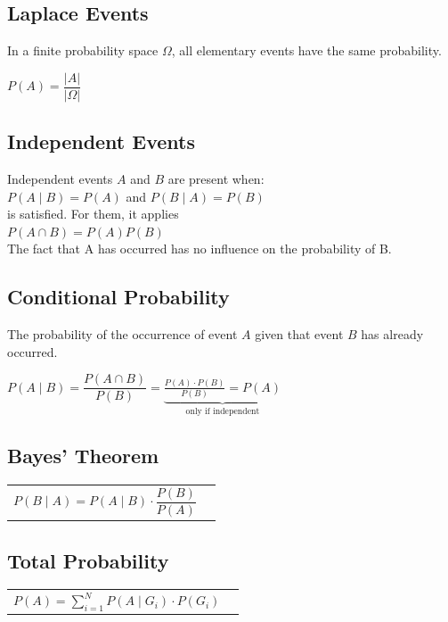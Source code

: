	\subsection{Laplace Events}
		In a finite probability space $\Omega$, all
		elementary events have the same probability.
		\begin{center}
		$P(A)=\dfrac{\left| A\right|}{\left|\Omega\right|}$
		\end{center}

	\subsection{Independent Events}
		Independent events $A$ and $B$ are present when:\\
		\hspace*{8mm} $P(A\mid B)=P(A)$ \hspace{4mm} and \hspace{4mm}
		$P(B\mid A)=P(B)$\\
		is satisfied. For them, it applies\\
		\hspace*{8mm} $P(A\cap B)=P(A)P(B)$\\
		The fact that A has occurred has no influence on the 
		probability of B.\vspace{1mm}


	\subsection{Conditional Probability}
		The probability of the occurrence of event $A$ given that
		event $B$ has already occurred.
		\begin{center}
		$P(A\mid B)= \dfrac{P(A\cap B)}{P(B)}=\underbrace{\frac{P(A)\cdot
		P(B)}{P(B)}=P(A)}_{\text{only if independent}}$ 
		\end{center}


	\subsection{Bayes' Theorem}
		\begin{tabular}{ll}
		$P(B\mid A)=P(A\mid B) \cdot\dfrac{P(B)}{P(A)}$\vspace{1mm}
		\end{tabular}


	\subsection{Total Probability}
		\begin{tabular}{ll}
		$P(A)=\sum\limits_{i=1}^N P(A\mid G_i)\cdot P(G_i)$
		\end{tabular}


